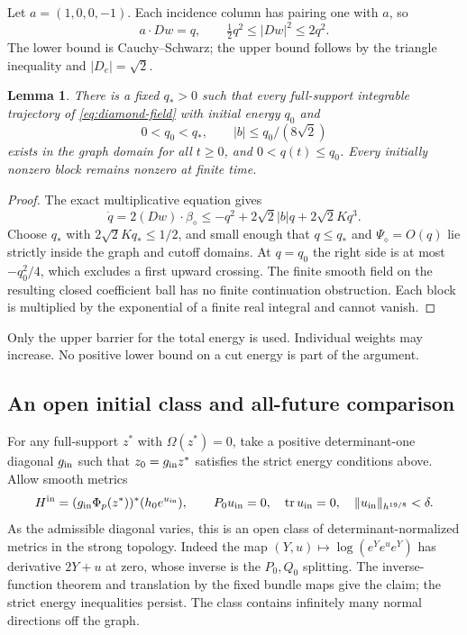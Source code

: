 \documentclass[11pt]{amsart}
\newtheorem{lemma}[theorem]{Lemma}
\theoremstyle{definition}
\theoremstyle{remark}
\newcommand{\tr}{\operatorname{tr}}
\begin{document}
Let $a=(1,0,0,-1)$. Each incidence column has pairing one with
$a$, so
\begin{equation}\label{eq:height-coercivity}
 a\cdot Dw=q,\qquad \tfrac12q^2\le|Dw|^2\le2q^2 .
\end{equation}
The lower bound is Cauchy--Schwarz; the upper bound follows by
the triangle inequality and $|D_e|=\sqrt2$.

\begin{lemma}\label{lem:diamond-confinement}
There is a fixed $q_*>0$ such that every full-support integrable
trajectory of \eqref{eq:diamond-field} with initial energy $q_0$
and
\begin{equation}\label{eq:diamond-initial-energy}
 0<q_0<q_*,\qquad |b|\le q_0/(8\sqrt2)
\end{equation}
exists in the graph domain for all $t\ge0$, and $0<q(t)\le q_0$.
Every initially nonzero block remains nonzero at finite time.
\end{lemma}
\begin{proof}
The exact multiplicative equation gives
\[
 \dot q=2(Dw)\cdot\beta_\diamond
 \le-q^2+2\sqrt2|b|q+2\sqrt2Kq^3.
\]
Choose $q_*$ with $2\sqrt2Kq_*\le1/2$, and small enough that
$q\le q_*$ and $\Psi_\diamond=O(q)$ lie strictly inside the graph
and cutoff domains. At $q=q_0$ the right side is at most
$-q_0^2/4$, which excludes a first upward crossing.
The finite smooth field on the resulting closed coefficient ball
has no finite continuation obstruction. Each block is multiplied
by the exponential of a finite real integral and cannot vanish.
\end{proof}

Only the upper barrier for the total energy is used. Individual
weights may increase. No positive lower bound on a cut energy is
part of the argument.

\subsection{An open initial class and all-future comparison}
For any full-support $z^*$ with $\Omega(z^*)=0$, take a positive
determinant-one diagonal $g_{\rm in}$ such that
$z_0=g_{\rm in}z^*$ satisfies the strict energy conditions above.
Allow smooth metrics
\begin{equation}\label{eq:diamond-initial-metric}
 H^{\rm in}=(g_{\rm in}\Phi_p(z^*))^*(h_0e^{u_{\rm in}}),
 \qquad P_0u_{\rm in}=0,\quad \tr u_{\rm in}=0,\quad
 \|u_{\rm in}\|_{h^{19/8}}<\delta .
\end{equation}
As the admissible diagonal varies, this is an open class of
determinant-normalized metrics in the strong topology. Indeed the
map $(Y,u)\mapsto\log(e^Ye^ue^Y)$ has derivative $2Y+u$ at zero,
whose inverse is the $P_0,Q_0$ splitting. The inverse-function
theorem and translation by the fixed bundle maps give the claim;
the strict energy inequalities persist. The class contains
infinitely many normal directions off the graph.
\end{document}
